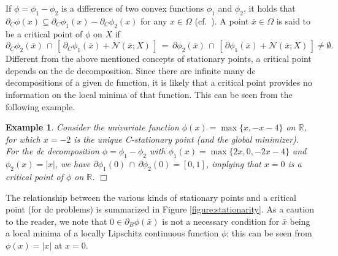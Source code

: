 \documentclass{siamart}
\newcommand{\wh}{\widehat}
\newtheorem{example}{Example}
\begin{document}
If  $\phi = \phi_1 - \phi_2$ is a difference of two convex functions $\phi_1$ and $\phi_2$, it holds that
$\partial_C \phi(x) \subseteq \partial_C \phi_1(x) -\partial_C \phi_2(x)$ for any $x\in \Omega$
(cf.\ \cite[Corollary 2]{Clarke1983}).   A point $\bar{x}\in \Omega$ is said to be a  critical point of $\phi$ on $X$ if
$$\partial_C \phi_2(\bar{x}) \, \cap \, [ \,\partial_C \phi_1(\bar{x}) + \mathcal{N}(\bar{x};X) \, ]
\, = \, \partial \phi_2(\bar{x}) \, \cap \, [ \, \partial \phi_1(\bar{x}) + \mathcal{N}(\bar{x};X) \, ] \neq \emptyset.$$
Different from the above mentioned concepts of stationary points, a critical point depends on the dc decomposition.
Since there are infinite many dc decompositions of a given dc function, it is likely that a critical point provides no information
on the local minima of that function.  This can be seen from the following example.
%


\begin{example}\label{ex: critical}
Consider the univariate function  $\phi(x) = \max\{x,-x-4\}$ on $\mathbb{R}$, for which $x = -2$ is the
unique C-stationary point (and the global minimizer).  For the dc decomposition $\phi = \phi_1 - \phi_2$ with
$\phi_1(x) =\max\{2x,0, -2x - 4\}$ and $\phi_2(x) = |x|$,
we have $\partial \phi_1(0) \, \cap \, \partial \phi_2(0) = [0,1]$,  implying that $x = 0$ is a critical point of $\phi$ on $\mathbb{R}$.
\hfill $\Box$
\end{example}


The relationship between the various kinds of stationary points and a critical point (for dc problems) is summarized in  Figure \ref{figure:stationarity}.
As a caution to the reader, we note that $0 \in \partial_B \phi(\bar{x})$ is not a necessary condition for $\bar{x}$
being a local minima of a locally Lipschitz continuous function $\phi$; this can be seen from $\phi(x) = |x|$ at $x = 0$.
\end{document}
